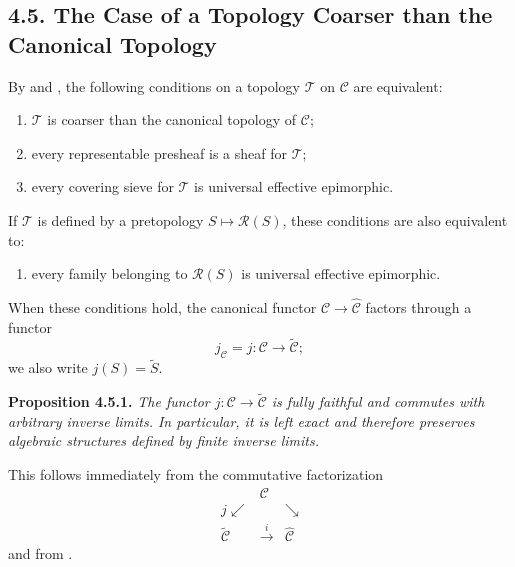 

\subsection*{4.5. The Case of a Topology Coarser than the Canonical Topology}

By  and , the following conditions on a topology \(\mathcal T\) on
\(\mathscr C\) are equivalent:
\begin{enumerate}
  \item[(i)] \(\mathcal T\) is coarser than the canonical topology of
    \(\mathscr C\);
  \item[(ii)] every representable presheaf is a sheaf for \(\mathcal T\);
  \item[(iii)] every covering sieve for \(\mathcal T\) is universal effective
    epimorphic.
\end{enumerate}
If \(\mathcal T\) is defined by a pretopology
\(S\mapsto\mathscr R(S)\), these conditions are also equivalent to:
\begin{enumerate}
  \item[(iv)] every family belonging to \(\mathscr R(S)\) is universal
    effective epimorphic.
\end{enumerate}

When these conditions hold, the canonical functor
\(\mathscr C\to\widehat{\mathscr C}\) factors through a functor
\[
  j_{\mathscr C}=j:\mathscr C\longrightarrow\widetilde{\mathscr C};
\]
we also write \(j(S)=\widetilde S\).

\medskip
\noindent{}\textbf{Proposition 4.5.1.}
\textit{The functor \(j:\mathscr C\to\widetilde{\mathscr C}\) is fully
faithful and commutes with arbitrary inverse limits. In particular, it is
left exact and therefore preserves algebraic structures defined by finite
inverse limits.}

This follows immediately from the commutative factorization
\[
\begin{array}{ccc}
 &\mathscr C&\\[-0.5ex]
 {\scriptstyle j}\swarrow&&\searrow\\[-0.5ex]
 \widetilde{\mathscr C}&\xrightarrow{\ i\ }&\widehat{\mathscr C}
\end{array}
\]
and from .

